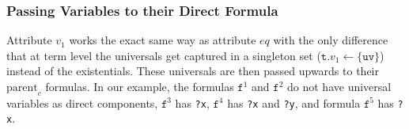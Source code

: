 \subsubsection{Passing Variables to their Direct Formula}
Attribute $v_1$ works the exact same way as attribute $eq$ with the only difference that at term level the universals
get captured in a singleton set ($\texttt{t}.v_1\leftarrow\{\texttt{uv}\}$)  instead of the existentials. These universals are then passed upwards to their $\text{parent}_c$ formulas.
In our example, the formulas $\texttt{f}^1$ and $\texttt{f}^2$ do not have universal variables as direct components, $\texttt{f}^3$ has \texttt{?x}, $\texttt{f}^4$ has \texttt{?x} and \texttt{?y},
and 
formula $\texttt{f}^5$ has \texttt{?x}.

